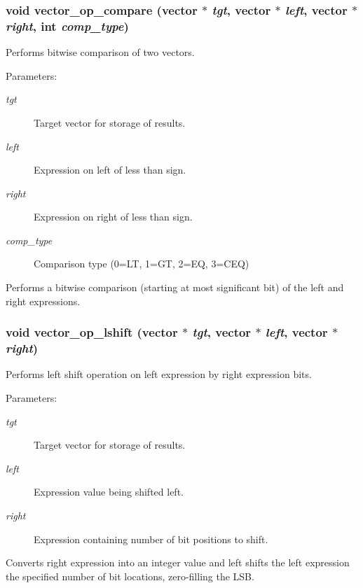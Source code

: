 \subsubsection{\setlength{\rightskip}{0pt plus 5cm}void vector\_\-op\_\-compare ({\bf vector} $\ast$ {\em tgt}, {\bf vector} $\ast$ {\em left}, {\bf vector} $\ast$ {\em right}, int {\em comp\_\-type})}\label{vector_8h_a23}


Performs bitwise comparison of two vectors.

\begin{Desc}
\item[Parameters: ]\par
\begin{description}
\item[{\em 
tgt}]Target vector for storage of results. \item[{\em 
left}]Expression on left of less than sign. \item[{\em 
right}]Expression on right of less than sign. \item[{\em 
comp\_\-type}]Comparison type (0=LT, 1=GT, 2=EQ, 3=CEQ)\end{description}
\end{Desc}
Performs a bitwise comparison (starting at most significant bit) of the left and right expressions. 
\subsubsection{\setlength{\rightskip}{0pt plus 5cm}void vector\_\-op\_\-lshift ({\bf vector} $\ast$ {\em tgt}, {\bf vector} $\ast$ {\em left}, {\bf vector} $\ast$ {\em right})}\label{vector_8h_a24}


Performs left shift operation on left expression by right expression bits.

\begin{Desc}
\item[Parameters: ]\par
\begin{description}
\item[{\em 
tgt}]Target vector for storage of results. \item[{\em 
left}]Expression value being shifted left. \item[{\em 
right}]Expression containing number of bit positions to shift.\end{description}
\end{Desc}
Converts right expression into an integer value and left shifts the left expression the specified number of bit locations, zero-filling the LSB. 
